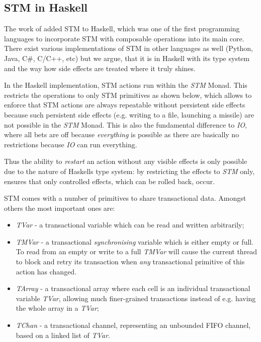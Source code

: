 \subsection{STM in Haskell}
The work of \cite{harris_composable_2005, harris_transactional_2006} added STM to Haskell, which was one of the first programming languages to incorporate STM with composable operations into its main core. There exist various implementations of STM in other languages as well (Python, Java, C\#, C/C++, etc) but we argue, that it is in Haskell with its type system and the way how side effects are treated where it truly shines.

In the Haskell implementation, STM actions run within the \textit{STM} Monad. This restricts the operations to only STM primitives as shown below, which allows to enforce that STM actions are always repeatable without persistent side effects because such persistent side effects (e.g. writing to a file, launching a missile) are not possible in the \textit{STM} Monad. This is also the fundamental difference to  \textit{IO}, where all bets are off because \textit{everything} is possible as there are basically no restrictions because \textit{IO} can run everything.

Thus the ability to \textit{restart} an action without any visible effects is only possible due to the nature of Haskells type system: by restricting the effects to \textit{STM} only, ensures that only controlled effects, which can be rolled back, occur.

STM comes with a number of primitives to share transactional data. Amongst others the most important ones are:

\begin{itemize}
	\item \textit{TVar} - a transactional variable which can be read and written arbitrarily;
	\item \textit{TMVar} - a transactional \textit{synchronising} variable which is either empty or full. To read from an empty or write to a full \textit{TMVar} will cause the current thread to block and retry its transaction when \textit{any} transactional primitive of this action has changed.
	\item \textit{TArray} - a transactional array where each cell is an individual transactional variable \textit{TVar}, allowing much finer-grained transactions instead of e.g. having the whole array in a \textit{TVar};
	\item \textit{TChan} - a transactional channel, representing an unbounded FIFO channel, based on a linked list of \textit{TVar}.
\end{itemize}

